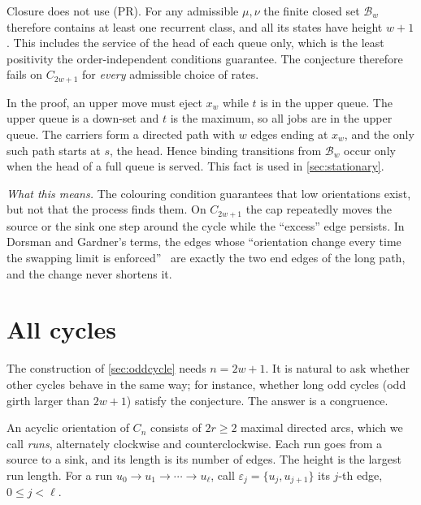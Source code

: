 \documentclass[11pt,a4paper]{article}
\theoremstyle{plain}
\theoremstyle{plain}
\newcommand{\Bal}{\mathcal{B}}
\newcommand{\what}[1]{\par\smallskip\noindent\textit{What this means.} #1\par\smallskip}
\begin{document}
\begin{remark}\label{rem:anyrates}
Closure does not use (PR). For any admissible $\mu,\nu$ the finite closed set $\Bal_w$ therefore contains at least one recurrent class, and all its states have height $w+1$. This includes the service of the head of each queue only, which is the least positivity the order-independent conditions guarantee. The conjecture therefore fails on $C_{2w+1}$ for \emph{every} admissible choice of rates.
\end{remark}

\begin{remark}\label{rem:heads}
In the proof, an upper move must eject $x_w$ while $t$ is in the upper queue. The upper queue is a down-set and $t$ is the maximum, so all jobs are in the upper queue. The carriers form a directed path with $w$ edges ending at $x_w$, and the only such path starts at $s$, the head. Hence binding transitions from $\Bal_w$ occur only when the head of a full queue is served. This fact is used in \cref{sec:stationary}.
\end{remark}

\what{The colouring condition guarantees that low orientations exist, but not that the process finds them. On $C_{2w+1}$ the cap repeatedly moves the source or the sink one step around the cycle while the ``excess'' edge persists. In Dorsman and Gardner's terms, the edges whose ``orientation change every time the swapping limit is enforced''~\cite[Appendix~C.2]{DG2024} are exactly the two end edges of the long path, and the change never shortens it.}

\section{All cycles}\label{sec:cycles}

The construction of \cref{sec:oddcycle} needs $n=2w+1$. It is natural to ask whether other cycles behave in the same way; for instance, whether long odd cycles (odd girth larger than $2w+1$) satisfy the conjecture. The answer is a congruence.

An acyclic orientation of $C_n$ consists of $2r\ge2$ maximal directed arcs, which we call \emph{runs}, alternately clockwise and counterclockwise. Each run goes from a source to a sink, and its length is its number of edges. The height is the largest run length. For a run $u_0\to u_1\to\cdots\to u_\ell$, call $\varepsilon_j=\{u_j,u_{j+1}\}$ its $j$-th edge, $0\le j<\ell$.
\end{document}
